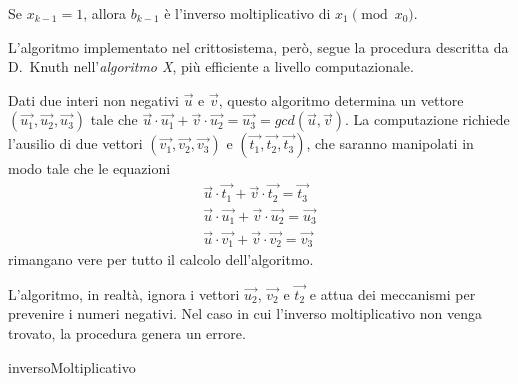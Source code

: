 Se $x_{k-1} = 1$, allora $b_{k-1}$ è l'inverso moltiplicativo di $x_1 \pmod{x_0}$.

L'algoritmo implementato nel crittosistema, però, segue la procedura descritta da D.~Knuth nell'\emph{algoritmo X}, più efficiente a livello computazionale.

Dati due interi non negativi $\vec{u}$ e $\vec{v}$, questo algoritmo determina un vettore $\left( \vec{u_1}, \vec{u_2}, \vec{u_3} \right)$ tale che $\vec{u}\cdot\vec{u_1} +  \vec{v}\cdot\vec{u_2} = \vec{u_3} = gcd(\vec{u}, \vec{v})$. La computazione richiede l'ausilio di due vettori $\left( \vec{v_1}, \vec{v_2}, \vec{v_3} \right)$ e $\left( \vec{t_1}, \vec{t_2}, \vec{t_3} \right)$, che saranno manipolati in modo tale che le equazioni
\begin{gather*}
	\vec{u}\cdot\vec{t_1} +  \vec{v}\cdot\vec{t_2} = \vec{t_3} \\
	\vec{u}\cdot\vec{u_1} +  \vec{v}\cdot\vec{u_2} = \vec{u_3} \\
	\vec{u}\cdot\vec{v_1} +  \vec{v}\cdot\vec{v_2} = \vec{v_3}
\end{gather*}
rimangano vere per tutto il calcolo dell'algoritmo.

L'algoritmo, in realtà, ignora i vettori $\vec{u_2}$, $\vec{v_2}$ e $\vec{t_2}$ e attua dei meccanismi per prevenire i numeri negativi. Nel caso in cui l'inverso moltiplicativo non venga trovato, la procedura genera un errore.

\begin{algorithm}[H]
	\caption{inversoMoltiplicativo}
	\label{alg:inversoMoltiplicativo}
	\DontPrintSemicolon
\end{algorithm}

